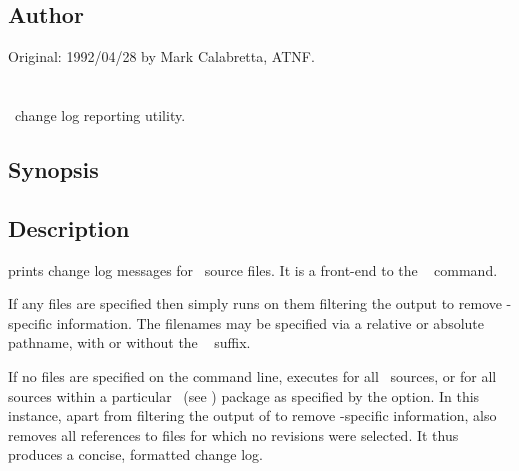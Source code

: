 \subsection*{Author}

Original: 1992/04/28 by Mark Calabretta, ATNF.


\newpage
\section{}
\label{alog}

\aipspp\ change log reporting utility.

\subsection*{Synopsis}

\begin{synopsis}
\end{synopsis}

\subsection*{Description}
 prints change log messages for \aipspp\ source files.  It is a
front-end to the \rcs\  command.

If any files are specified then  simply runs  on them
filtering the output to remove \rcs-specific information.  The filenames
may be specified via a relative or absolute pathname, with or without the
\rcs\  suffix.

If no files are specified on the command line,  executes
 for all \aipspp\ sources, or for all sources within a
particular \aipspp\ (see ) package as specified by the
 option.  In this instance, apart from filtering the output of
 to remove \rcs-specific information,  also removes
all references to files for which no revisions were selected.  It thus
produces a concise, formatted change log.

